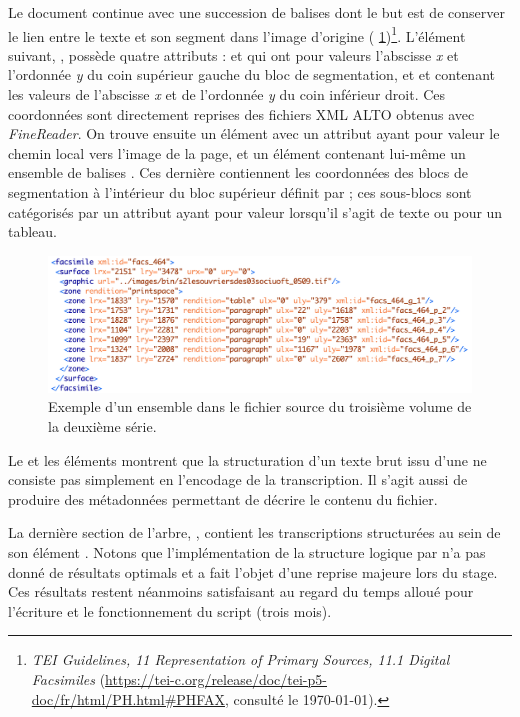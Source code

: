 Le document continue avec une succession de balises  dont le but est de conserver le lien entre le texte et son segment dans l'image d'origine (\fig{} \ref{fig:facsimile})\footnote{\textit{TEI Guidelines, 11 Representation of Primary Sources, 11.1 Digital Facsimiles} (\url{https://tei-c.org/release/doc/tei-p5-doc/fr/html/PH.html\#PHFAX}, consulté le \today).}. L'élément suivant, , possède quatre attributs :  et  qui ont pour valeurs l'abscisse \textit{x} et l'ordonnée \textit{y} du coin supérieur gauche du bloc de segmentation, et  et  contenant les valeurs de l'abscisse \textit{x} et de l'ordonnée \textit{y} du coin inférieur droit. Ces coordonnées sont directement reprises des fichiers XML ALTO obtenus avec \textit{FineReader}. On trouve ensuite un élément  avec un attribut  ayant pour valeur le chemin local vers l'image de la page, et un élément  contenant lui-même un ensemble de balises . Ces dernière contiennent les coordonnées des blocs de segmentation à l'intérieur du bloc supérieur définit par  ; ces sous-blocs sont catégorisés par un attribut  ayant pour valeur  lorsqu'il s'agit de texte ou  pour un tableau.

\begin{figure}
    \centering
    \includegraphics[width=16cm]{img/facsimile.png}
    \caption{Exemple d'un ensemble  dans le fichier source du troisième volume de la deuxième série.}
    \label{fig:facsimile}
\end{figure}

Le  et les éléments  montrent que la structuration d'un texte brut issu d'une \ocr{} ne consiste pas simplement en l'encodage de la transcription. Il s'agit aussi de produire des métadonnées permettant de décrire le contenu du fichier.

La dernière section de l'arbre, , contient les transcriptions structurées au sein de son élément . Notons que l'implémentation de la structure logique par \lse{} n'a pas donné de résultats optimals et a fait l'objet d'une reprise majeure lors du stage. Ces résultats restent néanmoins satisfaisant au regard du temps alloué pour l'écriture et le fonctionnement du  script (trois mois). 

